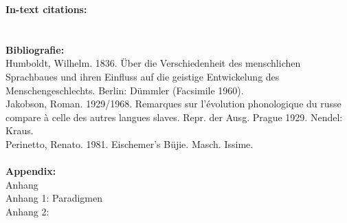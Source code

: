 \textbf{In-text citations:} \\
\\
\\
\textbf{Bibliografie:} \\
Humboldt, Wilhelm. 1836. Über die Verschiedenheit des menschlichen Sprachbaues und ihren Einfluss auf die geistige Entwickelung des Menschengeschlechts. Berlin: Dümmler (Facsimile 1960).\\
Jakobson, Roman. 1929/1968. Remarques sur l’évolution phonologique du russe compare à celle des autres langues slaves. Repr. der Ausg. Prague 1929. Nendel: Kraus.\\
Perinetto, Renato. 1981. Eischemer’s Büjie. Masch. Issime.
\\
\\
\textbf{Appendix:} \\
Anhang\\
Anhang 1: Paradigmen\\
Anhang 2: 

\nocite{Humboldt1836,Perinetto1981,Jakobson1929}


